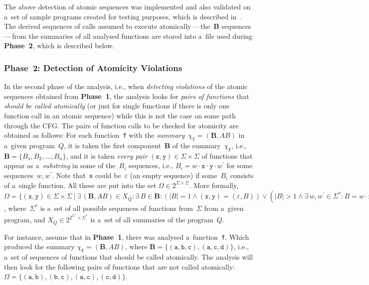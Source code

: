 The above detection of atomic sequences was implemented and also validated
on a~set of sample programs created for testing purposes, which is described
in~\cite{harmimBP}. The derived sequences of calls assumed to execute
atomically\,---\,the~$ \boldsymbol{B} $ sequences\,---\,from the summaries
of all analysed functions are stored into a~file used during \textbf{Phase~2},
which is described below.

\subsubsection{Phase~2: Detection of Atomicity Violations}

In the second phase of the analysis, i.e., when \emph{detecting violations}
of the atomic sequences obtained from \textbf{Phase~1}, the analysis looks
for \emph{pairs of functions} that \emph{should be called atomically} (or
just for single functions if there is only one function call in an atomic
sequence) while this is not the case on some path through the CFG. The
pairs of function calls to be checked for atomicity are obtained as
follows: For each function~\texttt{f} with the
\emph{summary}~$ \chi_\mathtt{f} = {(\boldsymbol{B}, AB)} $ in a~given
program~$ Q $, it is taken the first component~$ \boldsymbol{B} $ of the
summary~$ \chi_\mathtt{f} $, i.e., $ \boldsymbol{B} = {\{B_1, B_2,
\ldots, B_n\}} $, and it is taken \emph{every pair} $ {(\mathtt{x},
\mathtt{y})} \in \Sigma \times \Sigma $ of functions that appear as
a~\emph{substring} in some of the~$ B_i $ sequences, i.e., $ B_i = w \cdot
\mathtt{x} \cdot \mathtt{y} \cdot w^\prime $ for some sequences~$ w,
w^\prime $. Note that~\texttt{x} could be~$ \varepsilon $ (an empty
sequence) if some~$ B_i $ consists of a~single function. All these
 are put into the set $ \Omega \in 2^{\Sigma \times
\Sigma} $. More formally, $ \Omega = \{(\mathtt{x}, \mathtt{y}) \in
\Sigma \times \Sigma\ |\ \exists\,{(\boldsymbol{B}, AB)} \in X_Q :
\exists\,B \in \boldsymbol{B} : (|B| = 1 \wedge {(\mathtt{x}, \mathtt{y})}
= {(\varepsilon, B)}) \vee (|B| > 1 \wedge \exists\,w, w^\prime \in
\Sigma^* : B = w \cdot \mathtt{x} \cdot \mathtt{y} \cdot w^\prime \wedge
{(\mathtt{x}, \mathtt{y})} \neq {(\varepsilon, \varepsilon)})\} $,
where~$ \Sigma^* $ is a~set of all possible sequences of functions
from~$ \Sigma $ from a~given program, and $ X_Q \in 2^{2^{\Sigma^*}
\times \Sigma^*} $ is a~set of all summaries of the program~$ Q $.

\begin{example}
    For instance, assume that in \textbf{Phase~1}, there was analysed
    a~function~\texttt{f}. Which produced the summary
    $ \chi_\mathtt{f} = (\boldsymbol{B}, AB) $, where
    $ \boldsymbol{B} = \{{(\mathtt{a}, \mathtt{b}, \mathtt{c})},
    {(\mathtt{a}, \mathtt{c}, \mathtt{d})\}} $, i.e., a~set of
    sequences of functions that should be called atomically. The
    analysis will then look for the following pairs of functions that
    are not called atomically: $ \Omega = \{{(\mathtt{a}, \mathtt{b})},
    {(\mathtt{b}, \mathtt{c})}, {(\mathtt{a}, \mathtt{c})},
    {(\mathtt{c}, \mathtt{d})}\} $.
\end{example}

